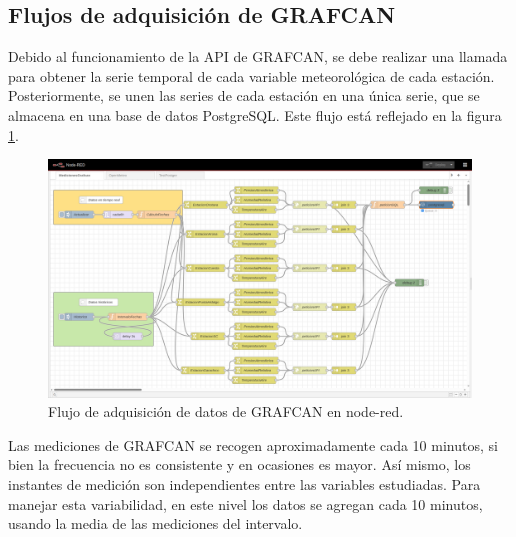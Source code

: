 \subsection{Flujos de adquisición de GRAFCAN}
Debido al funcionamiento de la API de GRAFCAN, se debe realizar una llamada para obtener la serie temporal de cada variable meteorológica de cada estación.
Posteriormente, se unen las series de cada estación en una única serie, que se almacena en una base de datos PostgreSQL. Este flujo está reflejado en la figura \ref{GRAFCAN_flows}.
\begin{figure}[htb]
   \centering
   \includegraphics[width=1\linewidth]{images/node-red_GRAFCAN.png}
   \caption{Flujo de adquisición de datos de GRAFCAN en node-red.}
   \label{GRAFCAN_flows}
\end{figure}

Las mediciones de GRAFCAN se recogen aproximadamente cada 10 minutos, si bien la frecuencia no es consistente y en ocasiones es mayor. Así mismo, 
los instantes de medición son independientes entre las variables estudiadas. Para manejar esta variabilidad, 
en este nivel los datos se agregan cada 10 minutos, usando la media de las mediciones del intervalo.

